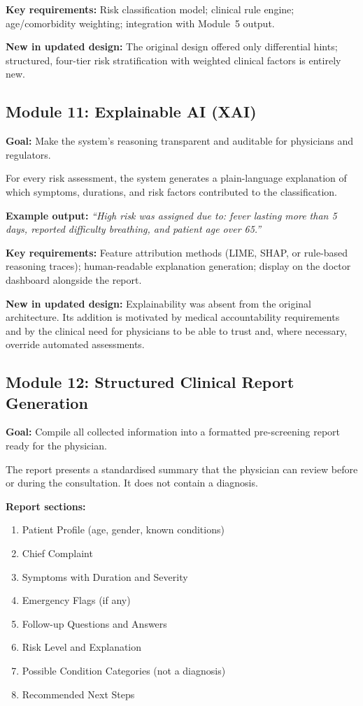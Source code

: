 \documentclass[12pt,a4paper]{article}
\begin{document}
\textbf{Key requirements:} Risk classification model; clinical rule
engine; age/comorbidity weighting; integration with Module~5 output.

\textbf{New in updated design:} The original design offered only
differential hints; structured, four-tier risk stratification with
weighted clinical factors is entirely new.

\subsection{Module 11: Explainable AI (XAI)}
\label{sec:m11}

\textbf{Goal:} Make the system's reasoning transparent and auditable for
physicians and regulators.

For every risk assessment, the system generates a plain-language
explanation of which symptoms, durations, and risk factors contributed
to the classification.

\textbf{Example output:} \textit{``High risk was assigned due to: fever
lasting more than 5 days, reported difficulty breathing, and patient age
over 65.''}

\textbf{Key requirements:} Feature attribution methods (LIME, SHAP, or
rule-based reasoning traces); human-readable explanation generation;
display on the doctor dashboard alongside the report.

\textbf{New in updated design:} Explainability was absent from the
original architecture. Its addition is motivated by medical
accountability requirements and by the clinical need for physicians to
be able to trust and, where necessary, override automated assessments.

\subsection{Module 12: Structured Clinical Report Generation}
\label{sec:m12}

\textbf{Goal:} Compile all collected information into a formatted
pre-screening report ready for the physician.

The report presents a standardised summary that the physician can review
before or during the consultation. It does not contain a diagnosis.

\textbf{Report sections:}
\begin{enumerate}[leftmargin=*, noitemsep]
  \item Patient Profile (age, gender, known conditions)
  \item Chief Complaint
  \item Symptoms with Duration and Severity
  \item Emergency Flags (if any)
  \item Follow-up Questions and Answers
  \item Risk Level and Explanation
  \item Possible Condition Categories (not a diagnosis)
  \item Recommended Next Steps
\end{enumerate}
\end{document}
